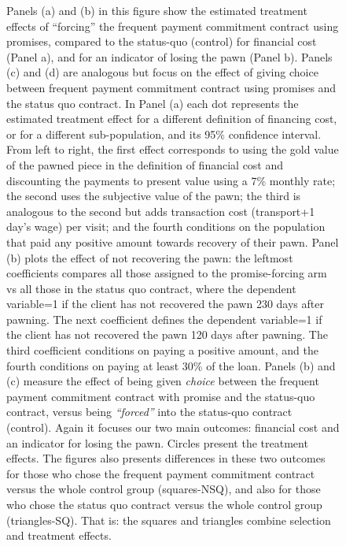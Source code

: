 \documentclass[oneside,11pt]{article}
\begin{document}
\begin{figure}[H]
\begin{center}
    \end{center}
    \scriptsize
    Panels (a) and (b) in this figure show the estimated treatment effects of ``forcing'' the frequent payment commitment contract using promises, compared to the status-quo (control) for financial cost (Panel a), and for an indicator of losing the pawn (Panel b). Panels (c) and (d) are analogous but focus on the effect of giving choice between frequent payment commitment contract using promises and the status quo contract. In Panel (a) each dot represents the estimated treatment effect for a different definition of financing cost, or for a different sub-population, and its 95\% confidence interval. From left to right, the first effect corresponds to using the gold value of the pawned piece in the definition of financial cost and discounting the payments to present value using a 7\% monthly rate; the second uses the subjective value of the pawn; the third is analogous to the second but adds transaction cost (transport+1 day's wage) per visit; and the fourth conditions on the population that paid any positive amount towards recovery of their pawn. Panel (b) plots the effect of not recovering the pawn: the leftmost coefficients compares all those assigned to the promise-forcing arm vs all those in the status quo contract, where the dependent variable=1 if the client has not recovered the pawn 230 days after pawning. The next coefficient defines the dependent variable=1 if the client has not recovered the pawn 120 days after pawning. The third coefficient conditions on paying a positive amount, and the fourth conditions on paying at least 30\% of the loan.   Panels (b) and (c) measure the effect of being given \textit{choice} between the frequent payment commitment contract with promise and the status-quo contract, versus being \textit{``forced''} into the status-quo contract (control). Again it focuses our two main outcomes: financial cost and an indicator for losing the pawn. Circles present the treatment effects. The figures also presents differences in these two outcomes for those who chose the frequent payment commitment contract versus the whole control group (squares-NSQ), and also for those who chose the status quo contract versus the whole control group (triangles-SQ). That is: the squares and triangles combine selection and treatment effects.
\end{figure}
\end{document}
